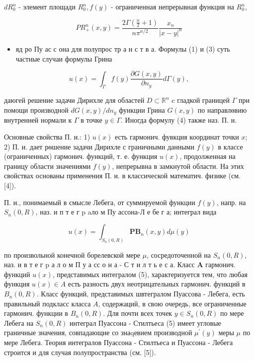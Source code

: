 \documentclass[10pt]{article}
\begin{document}
$d R_{0}^{n}$ - элемент площади $R_{0}^{n}, f(y)$ - ограниченная непрерывная функция на $R_{0}^{n}$,



\[

P R_{+}^{n}(x, y)=\frac{2 \Gamma\left(\frac{n}{2}+1\right)}{n \pi^{n / 2}} \frac{x_{n}}{|x-y|^{n}}

\]



\begin{itemize}

  \item яд ро Пу ас с она для полупрос тр а н с т в а. Формулы (1) и (3) суть частные случаи формулы Грина

\end{itemize}



\[

u(x)=\int_{\Gamma} f(y) \frac{\partial G(x, y)}{\partial n_{y}} d \Gamma(y),

\]



даюгей решение задачи Дирихле для областей $D \subset \mathbb{R}^{n}$ c гладкой границей $\Gamma$ при помощи производной $d G(x, y) / d n_{y}$ функции Грина $G(x, y)$ по направлөвию внутренней нормали к $\Gamma$ в точке $y \in \Gamma$. Иногда формулу (4) также наз. П. и.



Основные свойства П. и.: 1) $u(x)$ есть гармонич. фувкция координат точки $x$; 2) П. и. дает рөшение задачи Дирихле с граничными данными $f(y)$ в классе (ограниченных) гармонич. функций, т. е. функция $u(x)$, продолженная на границу области значениями $f(y)$, непрерывна в замкнутой области. На этих свойствах основаны применения П. и. в классической математич. физике (см. [4]).



П. и., понимаемый в смысле Лебега, от суммируемой функции $f(y)$, напр. на $S_{n}(0, R)$, наз. и п т е г p aло м Пу ассона-Л е бе г а; интеграл вида



\[

u(x)=\int_{S_{n}(0, R)} \boldsymbol{P B}_{n}(x, y) d \mu(y)

\]



по произвольной конечной борелевской мере $\mu$, сосредоточенной на $S_{n}(0, R)$, наз. и в т е г p а л о м П у а сс о н а - С т и л т ь е с а. Класс $\boldsymbol{A}$ гармонич. функций $u(x)$, представимых интегралом (5), характеризуется тем, что любая функция $u(x) \in A$ есть разность двух неотрицательных гармонич. функций в $B_{n}(0, R)$. Класс функций, представимых швтегралом Пуассова - Лебега, есть правильный подкласс класса $A$, содержаций, в свою очередь, все ограниченные гармонич. функции в $B_{n}(0, R)$. Для почти всех точек $y \in S_{n}(0, R)$ по мере Лебега на $S_{n}(0, R)$ интеграл Пуассона - Стилтьеса (5) имеет угловые граничные значения, совпадающие со знаqевием производной $\mu^{\prime}(y)$ меры $\mu$ по мере Лебега. Теория интегралов Пуассона - Стилтьеса и Пуассона - Лебега строится и для случая полупространства (см. [5]).
\end{document}
